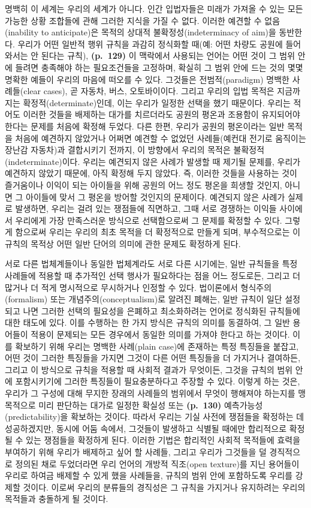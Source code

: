 명백히 이 세계는 우리의 세계가 아니다. 인간 입법자들은 미래가 가져올 수
있는 모든 가능한 상황 조합들에 관해 그러한 지식을 가질 수 없다. 이러한
예견할 수 없음(inability to anticipate)은 목적의 상대적
불확정성(indeterminacy of aim)을 동반한다. 우리가 어떤 일반적 행위
규칙을 과감히 정식화할 때(예: 어떤 차량도 공원에 들어와서는 안 된다는
규칙), \textbf{(p.~129)} 이 맥락에서 사용되는 언어는 어떤 것이 그 범위
안에 들려면 충족해야 하는 필요조건들을 고정하며, 확실히 그 범위 안에
드는 것의 몇몇 명확한 예들이 우리의 마음에 떠오를 수 있다. 그것들은
전범적(paradigm) 명백한 사례들(clear cases), 곧 자동차, 버스,
오토바이이다. 그리고 우리의 입법 목적은 지금까지는
확정적(determinate)인데, 이는 우리가 일정한 선택을 했기 때문이다. 우리는
적어도 이러한 것들을 배제하는 대가를 치르더라도 공원의 평온과 조용함이
유지되어야 한다는 문제를 처음에 확정해 두었다. 다른 한편, 우리가 공원의
평온이라는 일반 목적을 처음에 예견하지 않았거나 어쩌면 예견할 수 없었던
사례들(예컨대 전기로 움직이는 장난감 자동차)과 결합시키기 전까지, 이
방향에서 우리의 목적은 불확정적(indeterminate)이다. 우리는 예견되지 않은
사례가 발생할 때 제기될 문제를, 우리가 예견하지 않았기 때문에, 아직
확정해 두지 않았다. 즉, 이러한 것들을 사용하는 것이 즐거움이나 이익이
되는 아이들을 위해 공원의 어느 정도 평온을 희생할 것인지, 아니면 그
아이들에 맞서 그 평온을 방어할 것인지의 문제이다. 예견되지 않은 사례가
실제로 발생하면, 우리는 걸려 있는 쟁점들에 직면하고, 그때 서로 경쟁하는
이익들 사이에서 우리에게 가장 만족스러운 방식으로 선택함으로써 그 문제를
확정할 수 있다. 그렇게 함으로써 우리는 우리의 최초 목적을 더 확정적으로
만들게 되며, 부수적으로는 이 규칙의 목적상 어떤 일반 단어의 의미에 관한
문제도 확정하게 된다.

서로 다른 법체계들이나 동일한 법체계라도 서로 다른 시기에는, 일반
규칙들을 특정 사례들에 적용할 때 추가적인 선택 행사가 필요하다는 점을
어느 정도로든, 그리고 더 많거나 더 적게 명시적으로 무시하거나 인정할 수
있다. 법이론에서 형식주의(formalism) 또는 개념주의(conceptualism)로
알려진 폐해는, 일반 규칙이 일단 설정되고 나면 그러한 선택의 필요성을
은폐하고 최소화하려는 언어로 정식화된 규칙들에 대한 태도에 있다. 이를
수행하는 한 가지 방식은 규칙의 의미를 동결하여, 그 일반 용어들이 적용이
문제되는 모든 경우에서 동일한 의미를 가져야 한다고 하는 것이다. 이를
확보하기 위해 우리는 명백한 사례(plain case)에 존재하는 특정 특징들을
붙잡고, 어떤 것이 그러한 특징들을 가지면 그것이 다른 어떤 특징들을 더
가지거나 결여하든, 그리고 이 방식으로 규칙을 적용할 때 사회적 결과가
무엇이든, 그것을 규칙의 범위 안에 포함시키기에 그러한 특징들이
필요충분하다고 주장할 수 있다. 이렇게 하는 것은, 우리가 그 구성에 대해
무지한 장래의 사례들의 범위에서 무엇이 행해져야 하는지를 맹목적으로 미리
판단하는 대가로 일정한 확실성 또는 \textbf{(p.~130)}
예측가능성(predictability)을 확보하는 것이다. 따라서 우리는 기실 사전에
쟁점들을 확정하는 데 성공하겠지만, 동시에 어둠 속에서, 그것들이 발생하고
식별될 때에만 합리적으로 확정될 수 있는 쟁점들을 확정하게 된다. 이러한
기법은 합리적인 사회적 목적들에 효력을 부여하기 위해 우리가 배제하고
싶어 할 사례들, 그리고 우리가 그것들을 덜 경직적으로 정의된 채로
두었더라면 우리 언어의 개방적 직조(open texture)를 지닌 용어들이 우리로
하여금 배제할 수 있게 했을 사례들을, 규칙의 범위 안에 포함하도록 우리를
강제할 것이다. 이로써 우리의 분류들의 경직성은 그 규칙을 가지거나
유지하려는 우리의 목적들과 충돌하게 될 것이다.

